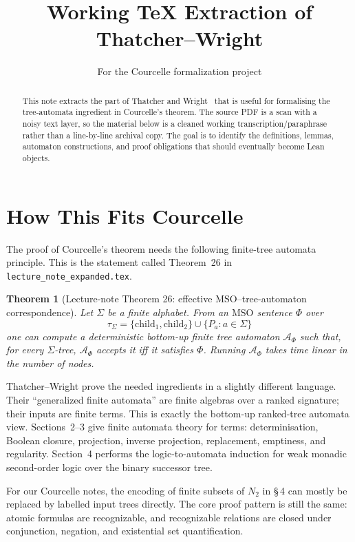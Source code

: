 \documentclass[11pt]{article}
\title{Working TeX Extraction of Thatcher--Wright}
\author{For the Courcelle formalization project}
\date{}
\newtheorem{theorem}{Theorem}
\theoremstyle{definition}
\newcommand{\TW}{Thatcher--Wright}
\newcommand{\Aut}{\mathcal A}
\newcommand{\MSO}{\mathrm{MSO}}
\newcommand{\child}{\mathrm{child}}
\begin{document}
\maketitle

\begin{abstract}
This note extracts the part of Thatcher and Wright~\cite{TW} that is useful for
formalising the tree-automata ingredient in Courcelle's theorem.  The source PDF
is a scan with a noisy text layer, so the material below is a cleaned working
transcription/paraphrase rather than a line-by-line archival copy.  The goal is
to identify the definitions, lemmas, automaton constructions, and proof
obligations that should eventually become Lean objects.
\end{abstract}

\tableofcontents

\section{How This Fits Courcelle}

The proof of Courcelle's theorem needs the following finite-tree automata
principle.  This is the statement called Theorem~26 in
\texttt{lecture\_note\_expanded.tex}.

\begin{theorem}[Lecture-note Theorem 26: effective \(\MSO\)--tree-automaton
correspondence]\label{thm:mso-tree-automata}\label{thm:lecture-note-26}
Let \(\Sigma\) be a finite alphabet.  From an \(\MSO\) sentence \(\Phi\) over
\[
  \tau_\Sigma=\{\child_1,\child_2\}\cup\{P_a:a\in\Sigma\}
\]
one can compute a deterministic bottom-up finite tree automaton
\(\Aut_\Phi\) such that, for every \(\Sigma\)-tree, \(\Aut_\Phi\) accepts it iff
it satisfies \(\Phi\).  Running \(\Aut_\Phi\) takes time linear in the number of
nodes.
\end{theorem}

\TW{} prove the needed ingredients in a slightly different language.
Their ``generalized finite automata'' are finite algebras over a ranked
signature; their inputs are finite terms.  This is exactly the bottom-up
ranked-tree automata view.  Sections~2--3 give finite automata theory for terms:
determinisation, Boolean closure, projection, inverse projection, replacement,
emptiness, and regularity.  Section~4 performs the logic-to-automata induction
for weak monadic second-order logic over the binary successor tree.

For our Courcelle notes, the encoding of finite subsets of \(N_2\) in
\S\,4 can mostly be replaced by labelled input trees directly.  The core proof
pattern is still the same: atomic formulas are recognizable, and recognizable
relations are closed under conjunction, negation, and existential set
quantification.
\end{document}
